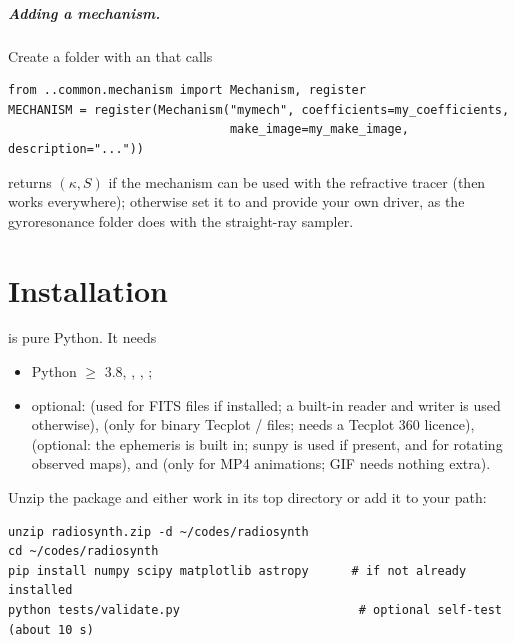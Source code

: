 \paragraph{Adding a mechanism.} Create a folder  with an
 that calls
\begin{lstlisting}[style=pyex]
from ..common.mechanism import Mechanism, register
MECHANISM = register(Mechanism("mymech", coefficients=my_coefficients,
                               make_image=my_make_image, description="..."))
\end{lstlisting}
 returns $(\kappa, S)$ if the
mechanism can be used with the refractive tracer (then  works
everywhere); otherwise set it to  and provide your own driver, as the
gyroresonance folder does with the straight-ray sampler.

\chapter{Installation}

 is pure Python. It needs

\begin{itemize}[itemsep=1pt]
  \item Python $\ge$ 3.8, , , ;
  \item optional:  (used for FITS files if installed; a built-in reader and
        writer is used otherwise),  (only for binary Tecplot
        / files; needs a Tecplot 360 licence), 
        (optional: the ephemeris is built in; sunpy is used if present, and for rotating observed maps), and
         (only for MP4 animations; GIF needs nothing extra).
\end{itemize}

Unzip the package and either work in its top directory or add it to your path:

\begin{lstlisting}
unzip radiosynth.zip -d ~/codes/radiosynth
cd ~/codes/radiosynth
pip install numpy scipy matplotlib astropy      # if not already installed
python tests/validate.py                         # optional self-test (about 10 s)
\end{lstlisting}


